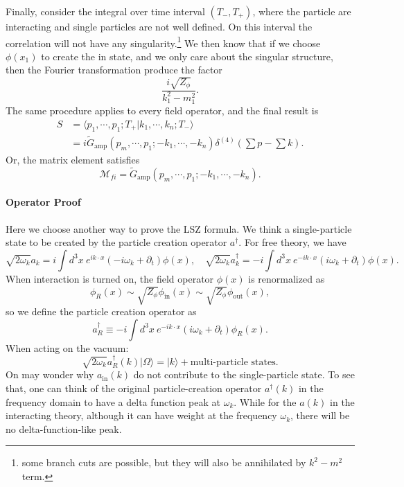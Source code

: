\documentclass[aps,prb,superscriptaddress,nofootinbib]{revtex4}
\begin{document}
Finally, consider the integral over time interval $(T_-,T_+)$, where the particle are interacting and single particles are not well defined.
On this interval the correlation will not have any singularity.\footnote{some branch cuts are possible, but they will also be annihilated by $k^2-m^2$ term.}
We then know that if we choose $\phi(x_1)$ to create the in state, and we only care about the singular structure, then the Fourier transformation produce the factor
\begin{equation}
	\frac{i\sqrt{Z_\phi}}{k_1^2-m_1^2}.
\end{equation}
The same procedure applies to every field operator, and the final result is
\begin{equation}
\begin{aligned}
	S &= \langle p_1,\cdots,p_1;T_+|k_1,\cdots,k_n;T_-\rangle \\
	&= i\tilde{G}_{\mathrm{amp}}(p_m,\cdots,p_1;-k_1,\cdots,-k_n) \delta^{(4)}\left(\sum p-\sum k \right).
\end{aligned}
\end{equation}
Or, the matrix element satisfies
\begin{equation}
	\mathcal M_{fi} = \tilde{G}_{\mathrm{amp}}(p_m,\cdots,p_1;-k_1,\cdots,-k_n).
\end{equation}


\paragraph*{Operator Proof}
Here we choose another way to prove the LSZ formula.
We think a single-particle state to be created by the particle creation operator $a^\dagger$.
For free theory, we have
\begin{equation}
	\sqrt{2\omega_k} a_k = i \int d^3 x\ e^{ik\cdot x}(-i\omega_k+\partial_t)\phi(x), \quad
	\sqrt{2\omega_k} a^\dagger_k = -i \int d^3 x\ e^{-ik\cdot x}(i\omega_k+\partial_t)\phi(x).
\end{equation}
When interaction is turned on, the field operator $\phi(x)$ is renormalized as
\begin{equation*}
	\phi_R(x) \sim \sqrt{Z_{\phi}} \phi_{\mathrm{in}}(x) \sim \sqrt{Z_{\phi}} \phi_{\mathrm{out}}(x),
\end{equation*}
so we define the particle creation operator as
\begin{equation}
	a_R^\dagger \equiv -i \int d^3 x\ e^{-ik\cdot x}(i\omega_k+\partial_t)\phi_R(x).
\end{equation}
When acting on the vacuum:
\begin{equation}
	\sqrt{2\omega_k} a_R^\dagger(k) |\Omega\rangle = |k\rangle + \text{multi-particle states}.
\end{equation}
On may wonder why $a_{\mathrm{in}}(k)$ do not contribute to the single-particle state. 
To see that, one can think of the original particle-creation operator $a^\dagger(k)$ in the frequency domain to have a delta function peak at $\omega_k$.
While for the $a(k)$ in the interacting theory, although it can have weight at the frequency $\omega_k$, there will be no delta-function-like peak.
\end{document}
